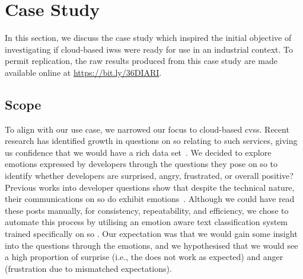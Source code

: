 \section{Case Study}\label{ase2020-industry:sec:study}
In this section, we discuss the case study which inspired the initial objective of investigating if cloud-based \glspl{iws} were ready for use in an industrial context. To permit replication, the raw results produced from this case study are made available online at \url{https://bit.ly/36DIARI}.

\subsection{Scope} 
To align with our use case, we narrowed our focus to cloud-based \glspl{cvs}. Recent research has identified growth in questions on \gls{so} relating to such services, giving us confidence that we would have a rich data set~\citep{Cummaudo:2020icse}.  We decided to explore emotions expressed by developers through the questions they pose on \gls{so} to identify whether developers are surprised, angry, frustrated, or overall positive? Previous works into developer questions show that despite the technical nature, their communications on \gls{so} do exhibit emotions~\citep{Novielli:2015vda, calefato2017}.  Although we could have read these posts manually, for consistency, repeatability, and efficiency, we chose to automate this process by utilising an emotion aware text classification system trained specifically on \gls{so} \citep{novielli2018}. Our expectation was that we would gain some insight into the questions through the emotions, and we hypothesised that we would see a high proportion of surprise (i.e., the  does not work as expected) and anger (frustration due to mismatched expectations).

